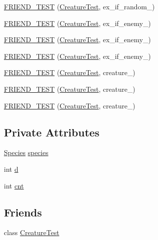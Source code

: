 \begin{DoxyCompactItemize}
\item 
\hyperlink{classCreature_acea5d626d306e827962fe050c7dc524f}{F\-R\-I\-E\-N\-D\-\_\-\-T\-E\-S\-T} (\hyperlink{classCreature_a8c0a0bc2c49a9483eb70dbe9f74d0b9a}{Creature\-Test}, ex\-\_\-if\-\_\-random\-\_)
\item 
\hyperlink{classCreature_a13136c1f1fca622372c9d3849c1d9535}{F\-R\-I\-E\-N\-D\-\_\-\-T\-E\-S\-T} (\hyperlink{classCreature_a8c0a0bc2c49a9483eb70dbe9f74d0b9a}{Creature\-Test}, ex\-\_\-if\-\_\-enemy\-\_)
\item 
\hyperlink{classCreature_a5273b56798a0ee7d29dfb663bd41afe9}{F\-R\-I\-E\-N\-D\-\_\-\-T\-E\-S\-T} (\hyperlink{classCreature_a8c0a0bc2c49a9483eb70dbe9f74d0b9a}{Creature\-Test}, ex\-\_\-if\-\_\-enemy\-\_)
\item 
\hyperlink{classCreature_a7a9045519405d3acd8e1a9477c41e385}{F\-R\-I\-E\-N\-D\-\_\-\-T\-E\-S\-T} (\hyperlink{classCreature_a8c0a0bc2c49a9483eb70dbe9f74d0b9a}{Creature\-Test}, ex\-\_\-if\-\_\-enemy\-\_)
\item 
\hyperlink{classCreature_a132d08f5021dbbb1d8642827451824bb}{F\-R\-I\-E\-N\-D\-\_\-\-T\-E\-S\-T} (\hyperlink{classCreature_a8c0a0bc2c49a9483eb70dbe9f74d0b9a}{Creature\-Test}, creature\-\_)
\item 
\hyperlink{classCreature_a7d98edec998504c32bfb3724225f7b30}{F\-R\-I\-E\-N\-D\-\_\-\-T\-E\-S\-T} (\hyperlink{classCreature_a8c0a0bc2c49a9483eb70dbe9f74d0b9a}{Creature\-Test}, creature\-\_)
\item 
\hyperlink{classCreature_a73bdc3f0cfdb2c29ad1dda3f2ad3762f}{F\-R\-I\-E\-N\-D\-\_\-\-T\-E\-S\-T} (\hyperlink{classCreature_a8c0a0bc2c49a9483eb70dbe9f74d0b9a}{Creature\-Test}, creature\-\_)
\end{DoxyCompactItemize}
\subsection*{Private Attributes}
\begin{DoxyCompactItemize}
\item 
\hyperlink{classSpecies}{Species} \hyperlink{classCreature_ab0b67d0fe5520b895a7b3a4af4e80506}{species}
\item 
int \hyperlink{classCreature_ae087a10b645120093bb34f13e48c6bca}{d}
\item 
int \hyperlink{classCreature_ab34d977d533d69e85bbda9b855977522}{cnt}
\end{DoxyCompactItemize}
\subsection*{Friends}
\begin{DoxyCompactItemize}
\item 
class \hyperlink{classCreature_a8c0a0bc2c49a9483eb70dbe9f74d0b9a}{Creature\-Test}
\end{DoxyCompactItemize}


